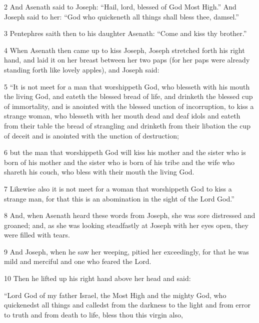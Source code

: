 \par 2 And Asenath said to Joseph: “Hail, lord, blessed of God Most High.” And Joseph said to her: “God who quickeneth all things shall bless thee, damsel.” 

\par 3 Pentephres saith then to his daughter Asenath: “Come and kiss thy brother.” 

\par 4 When Asenath then came up to kiss Joseph, Joseph stretched forth his right hand, and laid it on her breast between her two paps (for her paps were already standing forth like lovely apples), and Joseph said: 

\par 5 “It is not meet for a man that worshippeth God, who blesseth with his mouth the living God, and eateth the blessed bread of life, and drinketh the blessed cup of immortality, and is anointed with the blessed unction of incorruption, to kiss a strange woman, who blesseth with her mouth dead and deaf idols and eateth from their table the bread of strangling and drinketh from their libation the cup of deceit and is anointed with the unction of destruction; 

\par 6 but the man that worshippeth God will kiss his mother and the sister who is born of his mother and the sister who is born of his tribe and the wife who shareth his couch, who bless with their mouth the living God. 

\par 7 Likewise also it is not meet for a woman that worshippeth God to kiss a strange man, for that this is an abomination in the sight of the Lord God.” 

\par 8 And, when Asenath heard these words from Joseph, she was sore distressed and groaned; and, as she was looking steadfastly at Joseph with her eyes open, they were filled with tears. 

\par 9 And Joseph, when he saw her weeping, pitied her exceedingly, for that he was mild and merciful and one who feared the Lord. 

\par 10 Then he lifted up his right hand above her head and said: 

“Lord God of my father Israel, the Most High and the mighty God, 
who quickenedst all things and calledst from the darkness to the light 
and from error to truth and from death to life, 
bless thou this virgin also, 

